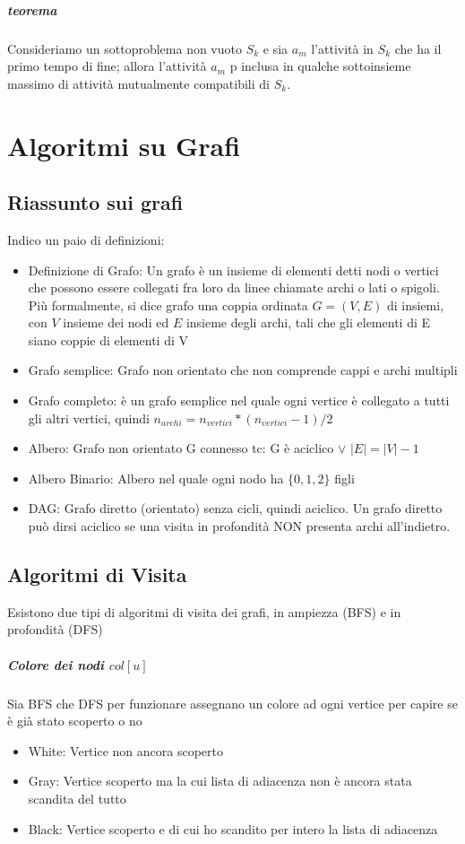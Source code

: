 \documentclass[12pt, a4paper, openany]{book}
\begin{document}
\paragraph*{teorema} Consideriamo un sottoproblema non vuoto $S_k$ e sia $a_m$ l'attività in $S_k$ che ha il primo tempo di fine; allora l'attività $a_m$ p inclusa in qualche sottoinsieme massimo di attività mutualmente compatibili di $S_k$.


\chapter{Algoritmi su Grafi}
\section{Riassunto sui grafi}
Indico un paio di definizioni:
\begin{itemize}
	\item Definizione di Grafo: Un grafo è un insieme di elementi detti nodi o vertici che possono essere collegati fra loro da linee chiamate archi o lati o spigoli. Più formalmente, si dice grafo una coppia ordinata $G=(V,E)$ di insiemi, con $V$ insieme dei nodi ed $E$ insieme degli archi, tali che gli elementi di E siano coppie di elementi di V
	\item Grafo semplice: Grafo non orientato che non comprende cappi e archi multipli
	\item Grafo completo: è un grafo semplice nel quale ogni vertice è collegato a tutti gli altri vertici, quindi $n_{archi} = n_{vertici} * (n_{vertici} - 1)/2$
	\item Albero: Grafo non orientato G connesso tc: G è aciclico $\lor$ $|E| = |V| - 1$
	\item Albero Binario: Albero nel quale ogni nodo ha $\{0,1,2\}$ figli
	\item DAG: Grafo diretto (orientato) senza cicli, quindi aciclico. Un grafo diretto può dirsi aciclico se una visita in profondità NON presenta archi all'indietro.
\end{itemize}
\section{Algoritmi di Visita}
Esistono due tipi di algoritmi di visita dei grafi, in ampiezza (BFS) e in profondità (DFS)

\paragraph{Colore dei nodi $col[u]$}
Sia BFS che DFS per funzionare assegnano un colore ad ogni vertice per capire se è già stato scoperto o no
\begin{itemize}
	\item White: Vertice non ancora scoperto
	\item Gray: Vertice scoperto ma la cui lista di adiacenza non è ancora stata scandita del tutto
	\item Black: Vertice scoperto e di cui ho scandito per intero la lista di adiacenza
\end{itemize}
\end{document}
